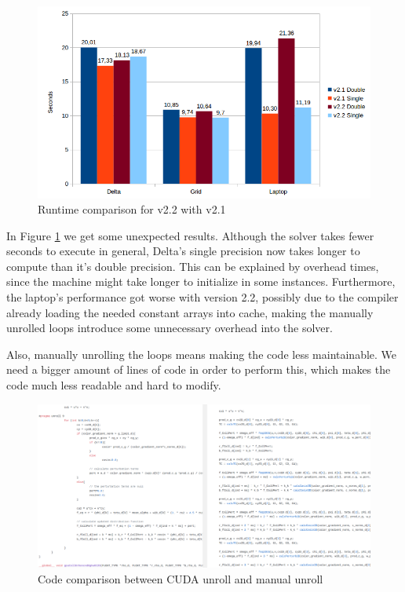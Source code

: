 \documentclass[12pt]{book}
\begin{document}
  \begin{figure}[H]
  	\centering
  	\includegraphics[width=\linewidth]{Resources/Images/v22.png}
  	\caption{Runtime comparison for v2.2 with v2.1}
  	\label{fig:v22}
  \end{figure}
  
  In Figure \ref{fig:v22} we get some unexpected results. Although the solver takes fewer seconds to execute in general, Delta's single precision now takes longer to compute than it's double precision. This can be explained by overhead times, since the machine might take longer to initialize in some instances. Furthermore, the laptop's performance got worse with version 2.2, possibly due to the compiler already loading the needed constant arrays into cache, making the manually unrolled loops introduce some unnecessary overhead into the solver.\par
  Also, manually unrolling the loops means making the code less maintainable. We need a bigger amount of lines of code in order to perform this, which makes the code much less readable and hard to modify.
  
   \begin{figure}[H]
   	\centering
   	\includegraphics[width=1.1\linewidth]{Resources/Images/unrollcode.png}
   	\caption{Code comparison between CUDA unroll and manual unroll}
   	\label{fig:unrollComp}
   \end{figure}
\end{document}
